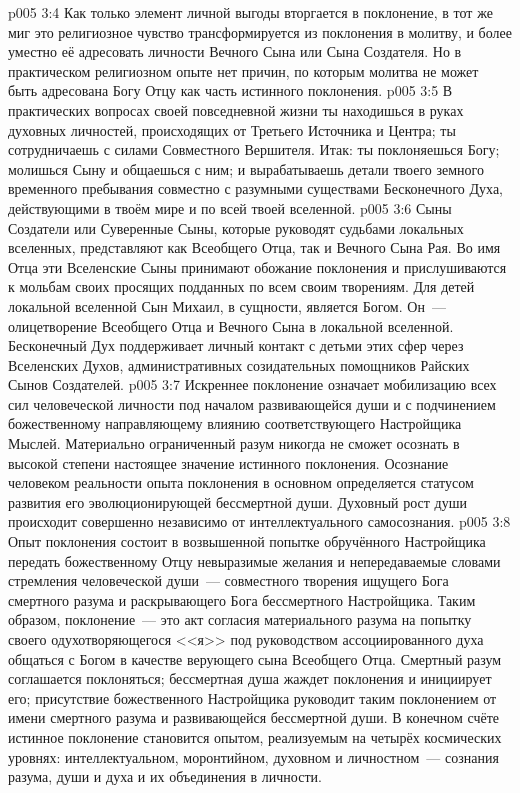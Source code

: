 \vs p005 3:4 Как только элемент личной выгоды вторгается в поклонение, в тот же миг это религиозное чувство трансформируется из поклонения в молитву, и более уместно её адресовать личности Вечного Сына или Сына Создателя. Но в практическом религиозном опыте нет причин, по которым молитва не может быть адресована Богу Отцу как часть истинного поклонения.
\vs p005 3:5 В практических вопросах своей повседневной жизни ты находишься в руках духовных личностей, происходящих от Третьего Источника и Центра; ты сотрудничаешь с силами Совместного Вершителя. Итак: ты поклоняешься Богу; молишься Сыну и общаешься с ним; и вырабатываешь детали твоего земного временного пребывания совместно с разумными существами Бесконечного Духа, действующими в твоём мире и по всей твоей вселенной.
\vs p005 3:6 \pc Сыны Создатели или Суверенные Сыны, которые руководят судьбами локальных вселенных, представляют как Всеобщего Отца, так и Вечного Сына Рая. Во имя Отца эти Вселенские Сыны принимают обожание поклонения и прислушиваются к мольбам своих просящих подданных по всем своим творениям. Для детей локальной вселенной Сын Михаил, в сущности, является Богом. Он~--- олицетворение Всеобщего Отца и Вечного Сына в локальной вселенной. Бесконечный Дух поддерживает личный контакт с детьми этих сфер через Вселенских Духов, административных созидательных помощников Райских Сынов Создателей.
\vs p005 3:7 \pc Искреннее поклонение означает мобилизацию всех сил человеческой личности под началом развивающейся души и с подчинением божественному направляющему влиянию соответствующего Настройщика Мыслей. Материально ограниченный разум никогда не сможет осознать в высокой степени настоящее значение истинного поклонения. Осознание человеком реальности опыта поклонения в основном определяется статусом развития его эволюционирующей бессмертной души. Духовный рост души происходит совершенно независимо от интеллектуального самосознания.
\vs p005 3:8 Опыт поклонения состоит в возвышенной попытке обручённого Настройщика передать божественному Отцу невыразимые желания и непередаваемые словами стремления человеческой души~--- совместного творения ищущего Бога смертного разума и раскрывающего Бога бессмертного Настройщика. Таким образом, поклонение~--- это акт согласия материального разума на попытку своего одухотворяющегося <<я>> под руководством ассоциированного духа общаться с Богом в качестве верующего сына Всеобщего Отца. Смертный разум соглашается поклоняться; бессмертная душа жаждет поклонения и инициирует его; присутствие божественного Настройщика руководит таким поклонением от имени смертного разума и развивающейся бессмертной души. В конечном счёте истинное поклонение становится опытом, реализуемым на четырёх космических уровнях: интеллектуальном, моронтийном, духовном и личностном~--- сознания разума, души и духа и их объединения в личности.
